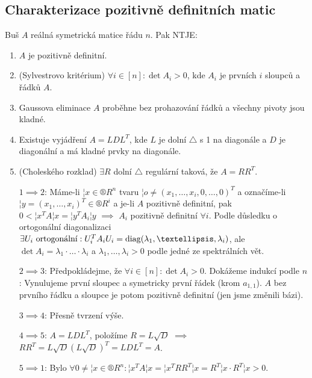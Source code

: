 \documentclass[12pt]{article}                   %
\begin{document}
    \subsection{Charakterizace pozitivně definitních matic}
        \begin{veta}
            Buš $A$ reálná symetrická matice řádu $n$. Pak NTJE:

            \begin{enumerate}
                \item $A$ je pozitivně definitní.
                \item (Sylvestrovo kritérium) $\forall i \in [n]: \det A_i > 0$, kde $A_i$ je prvních $i$ sloupců a řádků $A$.
                \item Gaussova eliminace $A$ proběhne bez prohazování řádků a všechny pivoty jsou kladné.
                \item Existuje vyjádření $A = LDL^T$, kde $L$ je dolní $\triangle$ s 1 na diagonále a $D$ je diagonální a má kladné prvky na diagonále.
                \item (Choleského rozklad) $\exists R$ dolní $\triangle$ regulární taková, že $A = RR^T$.

                \begin{dukazin}
                    $1 \implies 2$: Máme-li $¦x \in ®R^n$ tvaru $¦o ≠ (x_1, …, x_i, 0, …, 0)^T$ a označíme-li $¦y = (x_1, …, x_i)^T \in ®R^i$ a je-li $A$ pozitivně definitní, pak $0 < ¦x^T A ¦x = ¦y^TA_i¦y$ $\implies$ $A_i$ pozitivně definitní $\forall i$. Podle důsledku o ortogonální diagonalizaci $\exists U_i \text{ ortogonální}: U_i^T A_i U_i = \diag(\lambda_1, …, \lambda_i)$, ale $\det A_i = \lambda_1·…·\lambda_i$ a $\lambda_1, …, \lambda_i > 0$ podle jedné ze spektrálních vět.

                    $2 \implies 3$: Předpokládejme, že $\forall i \in [n]: \det A_i > 0$. Dokážeme indukcí podle $n$: Vynulujeme první sloupec a symetricky první řádek (krom $a_{1, 1}$). $A$ bez prvního řádku a sloupce je potom pozitivně definitní (jen jsme změnili bázi).

                    $3 \implies 4$: Přesně tvrzení výše.

                    $4 \implies 5$: $A = LDL^T$, položíme $R = L\sqrt{D}$ $\implies$ $RR^T = L\sqrt{D}(L\sqrt{D})^T = LDL^T = A$.

                    $5 \implies 1$: Bylo $\forall 0 ≠ ¦x \in ®R^n: ¦x^TA¦x = ¦x^TRR^T¦x = R^T¦x·R^T¦x > 0$.
                \end{dukazin}
            \end{enumerate}
        \end{veta}
\end{document}
